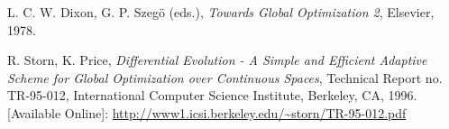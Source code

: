 \documentclass{article}
\begin{document}
	\newpage
	
	\begin{thebibliography}{9}
		
		 L. C. W. Dixon, G. P. Szegö (eds.), \textit{Towards Global Optimization 2}, Elsevier, 1978.
		
		 R. Storn, K. Price, \textit{Differential Evolution - A Simple and Efficient Adaptive Scheme for Global Optimization over Continuous Spaces}, Technical Report no. TR-95-012, International Computer Science Institute, Berkeley, CA, 1996. [Available Online]: \url{http://www1.icsi.berkeley.edu/~storn/TR-95-012.pdf}
		
		
	\end{thebibliography}
	
\end{document}
